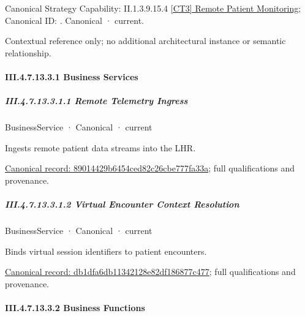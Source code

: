 {\small Canonical Strategy Capability: II.1.3.9.15.4 \hyperref[element:2d1addc7dd1d4821b71a11c692d35b27]{[CT3] Remote Patient Monitoring}; Canonical ID: \texttt{}. Canonical · current.}\par
Contextual reference only; no additional architectural instance or semantic relationship.\par
\paragraph*{III.4.7.13.3.1 Business Services}
\label{navigation:III.4.7.13.3.1}

\subparagraph*{III.4.7.13.3.1.1 Remote Telemetry Ingress}
\label{navigation:III.4.7.13.3.1.1}

\label{element:89014429b6454ced82c26cbe777fa33a}
{\small BusinessService · Canonical · current}\par

Ingests remote patient data streams into the LHR.


{\footnotesize \href{../../../../../../../continuum/business/business-service/89014429b6454ced82c26cbe777fa33a.md}{Canonical record: 89014429b6454ced82c26cbe777fa33a}; full qualifications and provenance.}\par
\subparagraph*{III.4.7.13.3.1.2 Virtual Encounter Context Resolution}
\label{navigation:III.4.7.13.3.1.2}

\label{element:db1dfa6db11342128e82df186877c477}
{\small BusinessService · Canonical · current}\par

Binds virtual session identifiers to patient encounters.


{\footnotesize \href{../../../../../../../continuum/business/business-service/db1dfa6db11342128e82df186877c477.md}{Canonical record: db1dfa6db11342128e82df186877c477}; full qualifications and provenance.}\par
\paragraph*{III.4.7.13.3.2 Business Functions}
\label{navigation:III.4.7.13.3.2}

